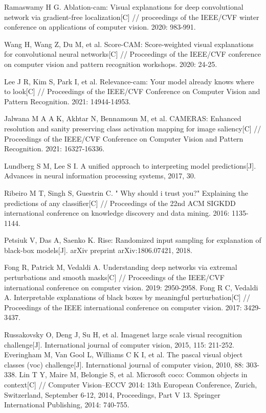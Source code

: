 \begin{thebibliography}{200}
Ramaswamy H G. Ablation-cam: Visual explanations for deep convolutional network via gradient-free localization[C] // proceedings of the IEEE/CVF winter conference on applications of computer vision. 2020: 983-991.

Wang H, Wang Z, Du M, et al. Score-CAM: Score-weighted visual explanations for convolutional neural networks[C] // Proceedings of the IEEE/CVF conference on computer vision and pattern recognition workshops. 2020: 24-25.

Lee J R, Kim S, Park I, et al. Relevance-cam: Your model already knows where to look[C] // Proceedings of the IEEE/CVF Conference on Computer Vision and Pattern Recognition. 2021: 14944-14953.

Jalwana M A A K, Akhtar N, Bennamoun M, et al. CAMERAS: Enhanced resolution and sanity preserving class activation mapping for image saliency[C] // Proceedings of the IEEE/CVF Conference on Computer Vision and Pattern Recognition. 2021: 16327-16336.

Lundberg S M, Lee S I. A unified approach to interpreting model predictions[J]. Advances in neural information processing systems, 2017, 30.

Ribeiro M T, Singh S, Guestrin C. " Why should i trust you?" Explaining the predictions of any classifier[C] // Proceedings of the 22nd ACM SIGKDD international conference on knowledge discovery and data mining. 2016: 1135-1144.

Petsiuk V, Das A, Saenko K. Rise: Randomized input sampling for explanation of black-box models[J]. arXiv preprint arXiv:1806.07421, 2018.

Fong R, Patrick M, Vedaldi A. Understanding deep networks via extremal perturbations and smooth masks[C] // Proceedings of the IEEE/CVF international conference on computer vision. 2019: 2950-2958.
Fong R C, Vedaldi A. Interpretable explanations of black boxes by meaningful perturbation[C] // Proceedings of the IEEE international conference on computer vision. 2017: 3429-3437.

Russakovsky O, Deng J, Su H, et al. Imagenet large scale visual recognition challenge[J]. International journal of computer vision, 2015, 115: 211-252.
Everingham M, Van Gool L, Williams C K I, et al. The pascal visual object classes (voc) challenge[J]. International journal of computer vision, 2010, 88: 303-338.
Lin T Y, Maire M, Belongie S, et al. Microsoft coco: Common objects in context[C] // Computer Vision–ECCV 2014: 13th European Conference, Zurich, Switzerland, September 6-12, 2014, Proceedings, Part V 13. Springer International Publishing, 2014: 740-755.


\end{thebibliography}
